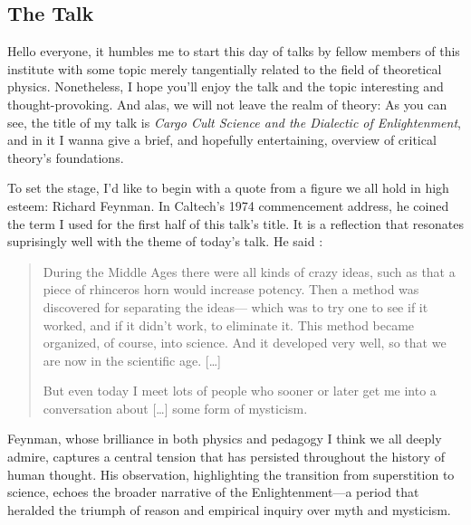 \subsection*{The Talk}
Hello everyone, it humbles me to start this day of talks by fellow members of
this institute with some topic merely tangentially related to the field of
theoretical physics. Nonetheless, I hope you'll enjoy the talk and the topic interesting
and thought-provoking. 
And alas, we will not leave the realm of theory: As you
can see, the title of my talk is \emph{Cargo Cult Science and the Dialectic of
Enlightenment}, and in it I wanna give a brief, and hopefully entertaining,
overview of critical theory's foundations.

To set the stage, I’d like to begin with a quote from a figure we all hold in
high esteem: Richard Feynman. In Caltech’s 1974 commencement address, he coined
the term I used for the first half of this talk's title. It is
a reflection that resonates suprisingly well with the theme of today’s talk. He
said \cite{feynmanCargoCultScience}:
\blockquote{
  During the Middle Ages there were all kinds of crazy ideas, such as that a
  piece of rhinceros horn would increase potency. Then a method was discovered
  for separating the ideas--- which was to try one to see if it worked, and if
  it didn't work, to eliminate it. This method became organized, of course,
  into science. And it developed very well, so that we are now in the
  scientific age. [\ldots]

  But even today I meet lots of people who sooner or later get me into a
  conversation about [\ldots] some form of mysticism.
}

Feynman, whose brilliance in both physics and pedagogy I think we all deeply admire,
captures a central tension that has persisted throughout the history of human
thought. His observation, highlighting the transition from superstition to
science, echoes the broader narrative of the Enlightenment---a period that
heralded the triumph of reason and empirical inquiry over myth and mysticism.



